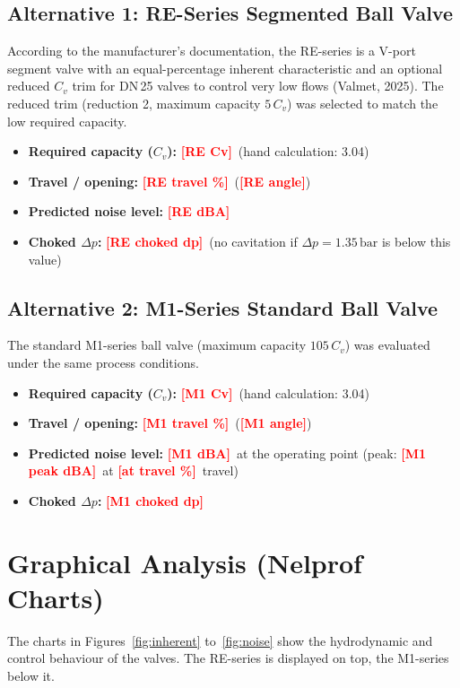 \documentclass[11pt,a4paper]{article}
\newcommand{\nel}[1]{\textcolor{red}{\textbf{[#1]}}}
\newcommand{\REcv}{\nel{RE Cv}}
\newcommand{\REtravel}{\nel{RE travel \%}}
\newcommand{\REangle}{\nel{RE angle}}
\newcommand{\REnoise}{\nel{RE dBA}}
\newcommand{\REchoked}{\nel{RE choked dp}}
\newcommand{\Mcv}{\nel{M1 Cv}}
\newcommand{\Mtravel}{\nel{M1 travel \%}}
\newcommand{\Mangle}{\nel{M1 angle}}
\newcommand{\Mnoise}{\nel{M1 dBA}}
\newcommand{\Mnoisepeak}{\nel{M1 peak dBA}}
\newcommand{\Mnoisepeaktravel}{\nel{at travel \%}}
\newcommand{\Mchoked}{\nel{M1 choked dp}}
\begin{document}
\subsection{Alternative 1: RE-Series Segmented Ball Valve}
According to the manufacturer's documentation, the RE-series is a V-port segment valve with an equal-percentage inherent characteristic and an optional reduced $C_v$ trim for DN\,25 valves to control very low flows (Valmet, 2025). The reduced trim (reduction 2, maximum capacity $5\,C_v$) was selected to match the low required capacity.
\begin{itemize}
    \item \textbf{Required capacity ($C_v$):} \REcv\ (hand calculation: 3.04)
    \item \textbf{Travel / opening:} \REtravel\ (\REangle)
    \item \textbf{Predicted noise level:} \REnoise
    \item \textbf{Choked $\Delta p$:} \REchoked\ (no cavitation if $\Delta p = 1.35\,\text{bar}$ is below this value)
\end{itemize}

\subsection{Alternative 2: M1-Series Standard Ball Valve}
The standard M1-series ball valve (maximum capacity $105\,C_v$) was evaluated under the same process conditions.
\begin{itemize}
    \item \textbf{Required capacity ($C_v$):} \Mcv\ (hand calculation: 3.04)
    \item \textbf{Travel / opening:} \Mtravel\ (\Mangle)
    \item \textbf{Predicted noise level:} \Mnoise\ at the operating point (peak: \Mnoisepeak\ at \Mnoisepeaktravel\ travel)
    \item \textbf{Choked $\Delta p$:} \Mchoked
\end{itemize}

\section{Graphical Analysis (Nelprof Charts)}
The charts in Figures~\ref{fig:inherent} to~\ref{fig:noise} show the hydrodynamic and control behaviour of the valves. The RE-series is displayed on top, the M1-series below it.
\end{document}
